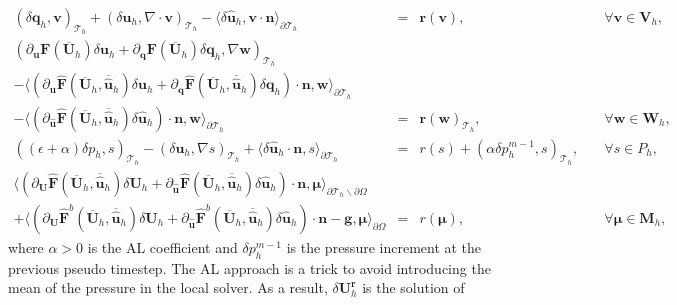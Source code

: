 \documentclass[11pt]{article}
\begin{document}
\begin{equation}
\begin{array}{rcll}
(\delta \bm{q}_h, \bm{v})_{\mathcal{T}_h} + (\delta \bm{u}_h, \nabla \cdot \bm{v})_{\mathcal{T}_h} - \langle \delta \widehat{\bm{u}}_h, \bm{v} \cdot \bm{n} \rangle_{\partial \mathcal{T}_h}  & = & \bm{r}(\bm{v}), & \quad \forall \bm{v} \in \bm{V}_h, \\[2ex] 
(\partial_{\bm{u}} \bm{F} (\overline{\bm{U}}_h) \delta \bm{u}_h + \partial_{\bm{q}} \bm{F} (\overline{\bm{U}}_h) \delta \bm{q}_h, \nabla \bm{w})_{\mathcal{T}_h} & & \\[2ex]
- \langle (\partial_{\bm{u}} \widehat{\bm{F}} (\overline{\bm{U}}_h,\overline{\widehat{\bm{u}}}_h) \delta \bm{u}_h + \partial_{{\bm{q}}} \widehat{\bm{F}} (\overline{\bm{U}}_h,\overline{\widehat{\bm{u}}}_h) \delta {\bm{q}}_h) \cdot \bm{n}, \bm{w} \rangle_{\partial \mathcal{T}_h} & & \\[2ex]
 - \langle (\partial_{\widehat{\bm{u}}} \widehat{\bm{F}} (\overline{\bm{U}}_h,  \overline{\widehat{\bm{u}}}_h) \delta \widehat{\bm{u}}_h) \cdot \bm{n}, \bm{w} \rangle_{\partial \mathcal{T}_h}   & = &  \bm{r}(\bm{w})_{\mathcal{T}_h},  & \quad \forall \bm{w} \in \bm{W}_h, \\[2ex]
 ((\epsilon + \alpha) \delta p_h, s)_{\mathcal{T}_h} - (\delta \bm{u}_h, \nabla s)_{\mathcal{T}_h} + \langle \delta \widehat{\bm{u}}_h \cdot \bm{n},s \rangle_{\partial \mathcal{T}_h}  & = & r(s) +  (\alpha \delta p_h^{m-1}, s)_{\mathcal{T}_h}, & \quad \forall s \in P_h, \\[2ex]
 \langle (\partial_{\bm{U}} \widehat{\bm{F}} (\overline{\bm{U}}_h, \overline{\widehat{\bm{u}}}_h) \delta\bm{U}_h + \partial_{\widehat{\bm{u}}} \widehat{\bm{F}} (\overline{\bm{U}}_h, \overline{\widehat{\bm{u}}}_h) \delta \widehat{\bm{u}}_h ) \cdot \bm{n}, \bm{\mu} \rangle_{\partial \mathcal{T}_h \backslash \partial \Omega} & & \\[2ex]
  + \langle (\partial_{\bm{U}} \widehat{\bm{F}}^b (\overline{\bm{U}}_h, \overline{\widehat{\bm{u}}}_h) \delta\bm{U}_h + \partial_{\widehat{\bm{u}}} \widehat{\bm{F}}^b (\overline{\bm{U}}_h, \overline{\widehat{\bm{u}}}_h) \delta \widehat{\bm{u}}_h ) \cdot \bm{n}  - \bm{g}, \bm{\mu} \rangle_{\partial \Omega}  & = & r(\bm{\mu}), & \quad \forall \bm{\mu} \in \bm{M}_h ,
\end{array}
\end{equation}
where $\alpha > 0$ is the AL coefficient and $\delta p_h^{m-1}$ is the pressure increment at the previous pseudo timestep. The AL approach is a trick to avoid introducing the mean of the pressure in the local solver. As a result, $\delta \bm{U}_h^{\bm{r}}$ is the solution of
\end{document}
